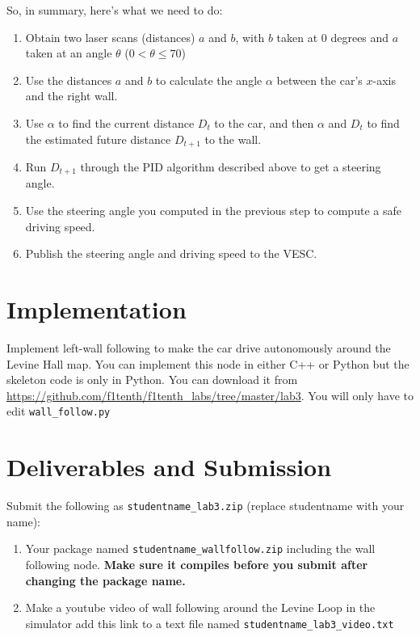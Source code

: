 \documentclass[letta4 paper]{article}
\numberwithin{equation}{section}
\newcommand{\0}{\mathbf{0}}
\begin{document}
	So, in summary, here's what we need to do:
	\begin{enumerate}
		\item Obtain two laser scans (distances) $a$ and $b$, with $b$ taken at 0 degrees and $a$ taken at an angle $\theta$ ($0 < \theta \leq 70$)
		\item Use the distances $a$ and $b$ to calculate the angle $\alpha$ between the car's $x$-axis and the right wall.
		\item Use $\alpha$ to find the current distance $D_t$ to the car, and then $\alpha$ and $D_t$ to find the estimated future distance $D_{t+1}$ to the wall.
		\item Run $D_{t+1}$ through the PID algorithm described above to get a steering angle.
		\item Use the steering angle you computed in the previous step to compute a safe driving speed.
		\item Publish the steering angle and driving speed to the VESC.
	\end{enumerate}


	\section{Implementation}
	Implement left-wall following to make the car drive autonomously around the Levine Hall map. You can implement this node in either C++ or Python but the skeleton code is only in Python. You can download it from \url{https://github.com/f1tenth/f1tenth_labs/tree/master/lab3}. You will only have to edit \texttt{wall\_follow.py}

	

	\section{Deliverables and Submission}
	Submit the following as \texttt{studentname\_lab3.zip} (replace studentname with your name):
	
	\begin{enumerate}
		\item Your package named \texttt{studentname\_wallfollow.zip} including the wall following node. \textbf{Make sure it compiles before you submit after changing the package name.}
		\item Make a youtube video of wall following around the Levine Loop in the simulator add this link to a text file named \texttt{studentname\_lab3\_video.txt}
	\end{enumerate}
\end{document}
